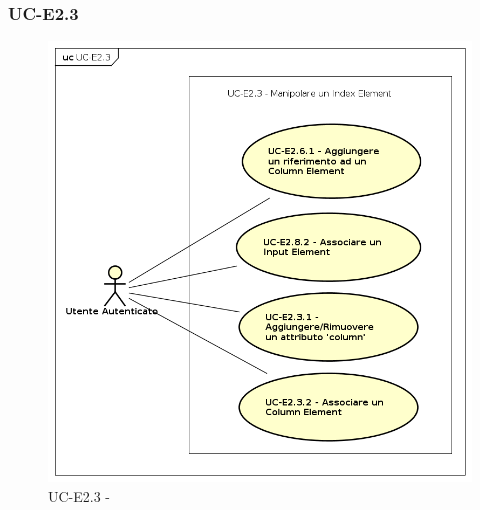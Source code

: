     
\subsubsection{UC-E2.3}
    \begin{figure}[H]
      \begin{center}
        \includegraphics[width=12cm]{res/img/UCEditor/UC-E2.3.png}
      \caption{UC-E2.3 - }
      \end{center} 
    \end{figure}

